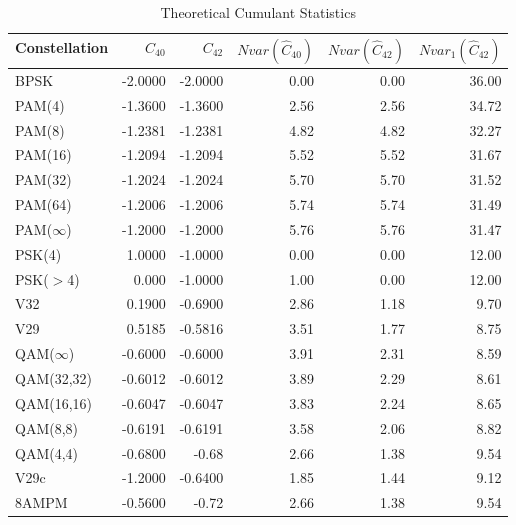 \begin{table}
\caption{Theoretical Cumulant Statistics \cite{swami2000}}
\begin{tabular}{ l | r | r| r| r| r } \hline
Constellation	& $C_{40}$ & $C_{42}$ & $N var(\hat{C}_{40})$ & $N var(\hat{C}_{42}) $ & $N var_1 (\hat{C}_{42})$ \\ \hline \hline
BPSK & -2.0000 & -2.0000 & 0.00 & 0.00 & 36.00 \\ \hline \hline
PAM(4) & -1.3600 & -1.3600 & 2.56 & 2.56 & 34.72 \\ 
PAM(8) & -1.2381 & -1.2381 & 4.82 & 4.82 & 32.27 \\
PAM(16) & -1.2094 & -1.2094 & 5.52 & 5.52 & 31.67 \\
PAM(32) & -1.2024 & -1.2024 & 5.70 & 5.70 & 31.52 \\ 
PAM(64) & -1.2006 & -1.2006 & 5.74 & 5.74 & 31.49 \\
PAM($\infty$) & -1.2000 & -1.2000 & 5.76 & 5.76 & 31.47 \\ \hline \hline
PSK(4) & 1.0000 & -1.0000 & 0.00 & 0.00 & 12.00 \\ \hline
PSK($>$4) & 0.000 & -1.0000 & 1.00 & 0.00 & 12.00 \\ \hline \hline
V32 & 0.1900 & -0.6900 & 2.86 & 1.18 & 9.70 \\ \hline
V29 & 0.5185 & -0.5816 & 3.51 & 1.77 & 8.75 \\
QAM($\infty$) & -0.6000 & -0.6000 & 3.91 & 2.31 & 8.59 \\
QAM(32,32) & -0.6012 & -0.6012 & 3.89 & 2.29 & 8.61 \\
QAM(16,16) & -0.6047 & -0.6047 & 3.83 & 2.24 & 8.65 \\ 
QAM(8,8) & -0.6191 & -0.6191 & 3.58 & 2.06 & 8.82 \\
QAM(4,4) & -0.6800 & -0.68 & 2.66 & 1.38 & 9.54 \\ \hline
V29c & -1.2000 & -0.6400 & 1.85 & 1.44 & 9.12 \\ \hline
8AMPM & -0.5600 & -0.72 & 2.66 & 1.38 & 9.54 \\ \hline 
\end{tabular}
\label{tab:ModelAndFreq}
\label{tab:cumulantStat}
\end{table}


